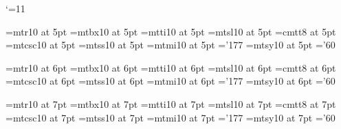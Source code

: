%
%
%
%

\catcode `\@=11 %

\def\@version{1.5}
\def\@verdate{25th Aug 1994}


%
%


\newif\ifprod@font

\ifx\@typeface\undefined
  \def\@typeface{Comp. Modern}\prod@fontfalse
\else
  \prod@fonttrue %
\fi

\def\newfam{\alloc@8\fam\chardef\sixt@@n} %

\ifprod@font
%
\font\fiverm=mtr10 at 5pt
\font\fivebf=mtbx10 at 5pt
\font\fiveit=mtti10 at 5pt
\font\fivesl=mtsl10 at 5pt
\font\fivett=cmtt8 at 5pt     \hyphenchar{}
\font\fivecsc=mtcsc10 at 5pt
\font\fivesf=mtss10 at 5pt
\font\fivei=mtmi10 at 5pt      \skewchar\fivei='177
\font\fivesy=mtsy10 at 5pt     \skewchar\fivesy='60

\font\sixrm=mtr10 at 6pt
\font\sixbf=mtbx10 at 6pt
\font\sixit=mtti10 at 6pt
\font\sixsl=mtsl10 at 6pt
\font\sixtt=cmtt8 at 6pt      \hyphenchar{}
\font\sixcsc=mtcsc10 at 6pt
\font\sixsf=mtss10 at 6pt
\font\sixi=mtmi10 at 6pt       \skewchar\sixi='177
\font\sixsy=mtsy10 at 6pt      \skewchar\sixsy='60

\font\sevenrm=mtr10 at 7pt
\font\sevenbf=mtbx10 at 7pt
\font\sevenit=mtti10 at 7pt
\font\sevensl=mtsl10 at 7pt
\font\seventt=cmtt8 at 7pt     \hyphenchar{}
\font\sevencsc=mtcsc10 at 7pt
\font\sevensf=mtss10 at 7pt
\font\seveni=mtmi10 at 7pt      \skewchar\seveni='177
\font\sevensy=mtsy10 at 7pt     \skewchar\sevensy='60

